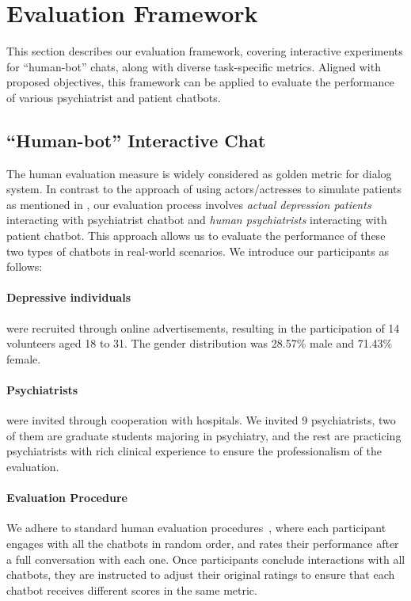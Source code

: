\section{Evaluation Framework}
\label{sec:eval_frameworks}

This section describes our evaluation framework, covering interactive experiments for ``human-bot'' chats, along with diverse task-specific metrics. Aligned with proposed objectives, this framework can be applied to evaluate the performance of various psychiatrist and patient chatbots.

\subsection{``Human-bot'' Interactive Chat}
The human evaluation measure is widely considered as golden metric for dialog system. In contrast to the approach of using actors/actresses to simulate patients as mentioned in \citet{yao-etal-2022-d4}, our evaluation process involves \textit{actual depression patients} interacting with psychiatrist chatbot and \textit{human psychiatrists} interacting with patient chatbot. 
This approach allows us to evaluate the performance of these two types of chatbots in real-world scenarios.
We introduce our participants as follows:

\paragraph{Depressive individuals} were recruited through online advertisements, resulting in the participation of 14 volunteers aged 18 to 31. The gender distribution was 28.57\% male and 71.43\% female. 

\paragraph{Psychiatrists} were invited through cooperation with hospitals. We invited 9 psychiatrists, two of them are graduate students majoring in psychiatry, and the rest are practicing psychiatrists with rich clinical experience to ensure the professionalism of the evaluation.

\paragraph{Evaluation Procedure}
We adhere to standard human evaluation procedures~\cite{Yue2023Beyond}, where each participant engages with all the chatbots in random order, and rates their performance after a full conversation with each one. Once participants conclude interactions with all chatbots, they are instructed to adjust their original ratings to ensure that each chatbot receives different scores in the same metric. 


